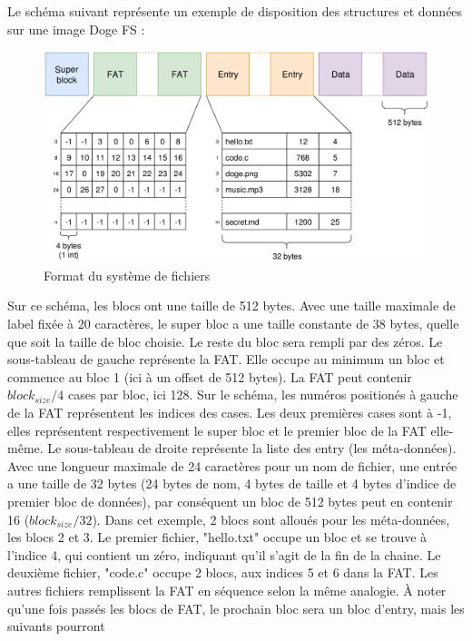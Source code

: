 \documentclass[a4paper, 12pt]{article}
\begin{document}
Le schéma suivant représente un exemple de disposition des structures et données sur une image Doge FS :
\begin{figure}
	\begin{center}
		\includegraphics[width=1.0\textwidth]{schema.png}
		\caption{Format du système de fichiers}
	\end{center}
\end{figure}
Sur ce schéma, les blocs ont une taille de 512 bytes. Avec une taille maximale de label fixée à 20 caractères,
le super bloc a une taille constante de 38 bytes, quelle que soit la taille de bloc choisie. Le reste du bloc
sera rempli par des zéros.
Le sous-tableau de gauche représente la FAT. Elle occupe au minimum un bloc et commence au bloc 1 (ici à un offset de 512 bytes).
La FAT peut contenir $block_{size} / 4$ cases par bloc, ici 128. Sur le schéma, les numéros positionés à gauche de la
FAT représentent les indices des cases. Les deux premières cases sont à -1, elles représentent respectivement
le super bloc et le premier bloc de la FAT elle-même.
Le sous-tableau de droite représente la liste des entry (les méta-données). Avec une longueur maximale de 24
caractères pour un nom de fichier, une entrée a une taille de 32 bytes (24 bytes de nom, 4 bytes de taille et
4 bytes d'indice de premier bloc de données), par conséquent un bloc de 512 bytes peut en contenir 16 
($block_{size} / 32$).
\bigbreak
Dans cet exemple, 2 blocs sont alloués pour les méta-données, les blocs 2 et 3. 
Le premier fichier, "hello.txt" occupe un bloc et se trouve à l'indice 4, qui contient un zéro, indiquant 
qu'il s'agit de la fin de la chaine. Le deuxième fichier, "code.c" occupe 2 blocs, aux indices 5 et 6 dans la FAT.
Les autres fichiers remplissent la FAT en séquence selon la même analogie.
À noter qu'une fois passés les blocs de FAT, le prochain bloc sera un bloc d'entry, mais les suivants pourront
\end{document}
